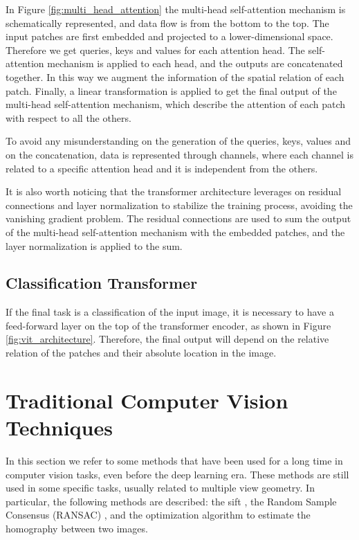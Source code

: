 In Figure \ref{fig:multi_head_attention} the multi-head self-attention mechanism 
is schematically represented, and data flow is from the bottom to the top. 
The input patches are first embedded and projected to a lower-dimensional space. 
Therefore we get queries, keys and values for each attention head. 
The self-attention mechanism is applied to each head, and the outputs are 
concatenated together. In this way we augment the information of the spatial 
relation of each patch. Finally, a linear transformation is applied to get 
the final output of the multi-head self-attention mechanism, which describe the 
attention of each patch with respect to all the others.

To avoid any misunderstanding on the generation of the queries, keys, values and 
on the concatenation, data is represented through channels, where each channel is 
related to a specific attention head and it is independent from the others.

It is also worth noticing that the transformer architecture leverages on residual 
connections and layer normalization to stabilize the training process, avoiding 
the vanishing gradient problem. The residual connections are used to sum the 
output of the multi-head self-attention mechanism with the embedded patches, 
and the layer normalization is applied to the sum.

\subsection{Classification Transformer}
If the final task is a classification of the input image, it is necessary 
to have a feed-forward layer on the top of the transformer encoder, as shown in 
Figure \ref{fig:vit_architecture}.
Therefore, the final output will depend on the relative relation of the patches 
and their absolute location in the image.


\section{Traditional Computer Vision Techniques}
In this section we refer to some methods that have been used for a long time 
in computer vision tasks, even before the deep learning era. These methods 
are still used in some specific tasks, usually related to multiple view geometry.
In particular, the following methods are described: the \ac{sift} \cite{lowe_sift}, 
the Random Sample Consensus (RANSAC) \cite{ransac}, and the optimization 
algorithm to estimate the homography between two images.

